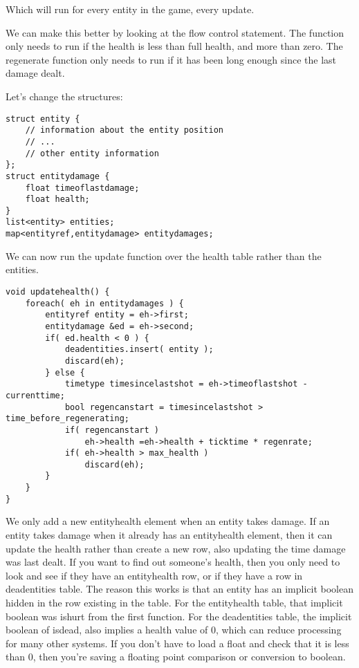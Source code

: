 Which will run for every entity in the game, every update.

We can make this better by looking at the flow control statement. The function
only needs to run if the health is less than full health, and more than zero.
The regenerate function only needs to run if it has been long enough since the
last damage dealt.

Let's change the structures:


\begin{lstlisting}[caption=existence based processing style health]
struct entity {
	// information about the entity position
	// ...
	// other entity information
};
struct entitydamage {
	float timeoflastdamage;
	float health;
}
list<entity> entities;
map<entityref,entitydamage> entitydamages;
\end{lstlisting}

We can now run the update function over the health table rather than the
entities.

\begin{lstlisting}[caption=every entity health regen]
void updatehealth() {
	foreach( eh in entitydamages ) {
		entityref entity = eh->first;
		entitydamage &ed = eh->second;
		if( ed.health < 0 ) {
			deadentities.insert( entity );
			discard(eh);
		} else {
			timetype timesincelastshot = eh->timeoflastshot - currenttime;
			bool regencanstart = timesincelastshot > time_before_regenerating;
			if( regencanstart )
				eh->health =eh->health + ticktime * regenrate;
			if( eh->health > max_health ) 
				discard(eh);
		}
	}
}
\end{lstlisting}

We only add a new entityhealth element when an entity takes damage. If an
entity takes damage when it already has an entityhealth element, then it can
update the health rather than create a new row, also updating the time damage
was last dealt. If you want to find out someone's health, then you only need to
look and see if they have an entityhealth row, or if they have a row in
deadentities table. The reason this works is that an entity has an implicit
boolean hidden in the row existing in the table. For the entityhealth table,
that implicit boolean was ishurt from the first function. For the deadentities
table, the implicit boolean of isdead, also implies a health value of 0, which
can reduce processing for many other systems. If you don't have to load a float
and check that it is less than 0, then you're saving a floating point
comparison or conversion to boolean.

